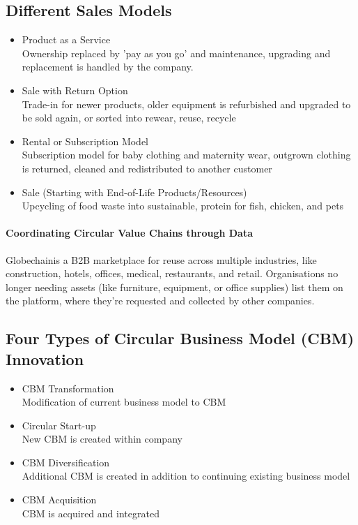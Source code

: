 \documentclass[11pt]{article}
\theoremstyle{definition}
\begin{document}
\subsection{Different Sales Models}
\begin{itemize}
	\item Product as a Service\\
	Ownership replaced by 'pay as you go' and maintenance, upgrading and replacement is handled by the company.
	\item Sale with Return Option\\
	Trade-in for newer products, older equipment is refurbished and upgraded to be sold again, or sorted into rewear, reuse, recycle
	\item Rental or Subscription Model\\
	Subscription model for baby clothing and maternity wear, outgrown clothing is returned, cleaned and redistributed to another customer
	\item Sale (Starting with End-of-Life Products/Resources)\\
	Upcycling of food waste into sustainable, protein for fish, chicken, and pets
\end{itemize}

\paragraph{Coordinating Circular Value Chains through Data} Globechainis a B2B marketplace for reuse across multiple industries, like construction, hotels, offices, medical, restaurants, and retail. Organisations no longer needing assets (like furniture, equipment, or office supplies) list them on the platform, where they’re requested and collected by other companies.

\subsection{Four Types of Circular Business Model (CBM) Innovation}
\begin{itemize}
	\item CBM Transformation\\
	Modification of current business model to CBM
	\item Circular Start-up\\
	New CBM is created within company
	\item CBM Diversification\\
	Additional CBM is created in addition to continuing existing business model
	\item CBM Acquisition\\
	CBM is acquired and integrated
\end{itemize}
\end{document}
